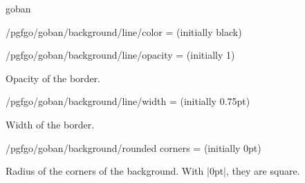 \begin{environment}{{goban}}
\begin{key}{/pgfgo/goban/background/line/color = (initially black)}
\begin{codeexample}[]
			\begin{goban}[background = {line = {color = blue}}, resume = a]
			\end{goban}
		\end{codeexample}
	\end{key}

	\begin{key}{/pgfgo/goban/background/line/opacity = (initially 1)}

		Opacity of the border.

		\begin{codeexample}[]

			\begin{goban}[background = {line = {color = red}}, name = a]
			\end{goban}

			\begin{goban}[resume = a,
				background = {line = {color = red}, line = {opacity = 0.5}}]
			\end{goban}
		\end{codeexample}
	\end{key}

	\begin{key}{/pgfgo/goban/background/line/width = (initially 0.75pt)}

		Width of the border.

		\begin{codeexample}[]

			\begin{goban}[name = a]
			\end{goban}

			\begin{goban}[background = {line = {width = 1.5pt}}, resume = a]
			\end{goban}
		\end{codeexample}
	\end{key}

	\begin{key}{/pgfgo/goban/background/rounded corners = (initially 0pt)}

		Radius of the corners of the background. With |0pt|, they are square.

		\begin{codeexample}[]

			\begin{goban}[name = a]
			\end{goban}


\end{codeexample}
\end{key}
\end{environment}
